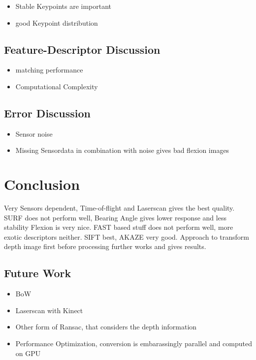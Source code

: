 \begin{itemize}
    \item Stable Keypoints are important
    \item good Keypoint distribution
\end{itemize}

\subsection{Feature-Descriptor Discussion}

\begin{itemize}
    \item matching performance
    \item Computational Complexity
\end{itemize}

\subsection{Error Discussion}
\begin{itemize}
    \item Sensor noise
    \item Missing Sensordata in combination with noise gives bad flexion images
\end{itemize}

\section{Conclusion}

Very Sensors dependent, Time-of-flight and Laserscan gives the best quality.
SURF does not perform well, Bearing Angle gives lower response and less stability
Flexion is very nice.
FAST based stuff does not perform well, more exotic descriptors neither.
SIFT best, AKAZE very good.
Approach to transform depth image first before processing further works and gives results.

\subsection{Future Work}

\begin{itemize}
    \item BoW
    \item Laserscan with Kinect
    \item Other form of Ransac, that considers the depth information
    \item Performance Optimization, conversion is embarassingly parallel and computed on GPU
\end{itemize}
